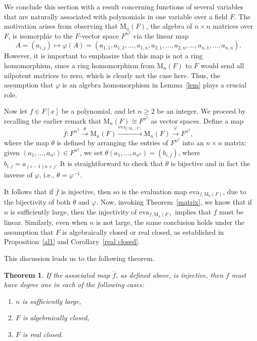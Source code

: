 \documentclass{amsart}
\newtheorem{theorem}{Theorem}[section]
\theoremstyle{definition}
\begin{document}
	We conclude this section with a result concerning functions of several variables that are naturally associated with polynomials in one variable over a field \( F \). The motivation arises from observing that \( \mathrm{M}_n(F) \), the algebra of \( n \times n \) matrices over \( F \), is isomorphic to the \( F \)-vector space \( F^{n^2} \) via the linear map
	\[
	A = (a_{i,j}) \mapsto \varphi(A) = (a_{1,1}, a_{1,2}, \ldots, a_{1,n}, a_{2,1}, \ldots, a_{2,n}, \ldots, a_{n,1}, \ldots, a_{n,n}).
	\]
	However, it is important to emphasize that this map is not a ring homomorphism, since a ring homomorphism from \( \mathrm{M}_n(F) \) to $F$ would send all nilpotent matrices to zero, which is clearly not the case here. Thus, the assumption that \( \varphi \) is an algebra homomorphism in Lemma~\ref{lem} plays a crucial role.
	
	
	Now let \( f \in F[x] \) be a polynomial, and let \( n\geq2 \) be an integer.  We proceed by recalling the earlier remark that \( \mathrm{M}_n(F) \cong F^{n^2} \) as vector spaces. Define a map
	\[
	\overline{f} : F^{n^2} \xrightarrow{\theta} \mathrm{M}_n(F) \xrightarrow{\mathrm{eva}_{f, \mathrm{M}_n(F)}} \mathrm{M}_n(F) \xrightarrow{\varphi} F^{n^2},
	\]
	where the map \( \theta \) is defined by arranging the entries of \( F^{n^2} \) into an \( n \times n \) matrix: given \( (a_1, \ldots, a_{n^2}) \in F^{n^2} \), we set \( \theta(a_1, \ldots, a_{n^2}) = (b_{i,j}) \), where \( b_{i,j} = a_{(i-1)n + j} \). It is straightforward to check that \( \theta \) is bijective and in fact the inverse of \( \varphi \), i.e., \( \theta = \varphi^{-1} \).
	
	It follows that if \( \overline{f} \) is injective, then so is the evaluation map \( \mathrm{eva}_{f, \mathrm{M}_n(F)} \), due to the bijectivity of both \( \theta \) and \( \varphi \). Now, invoking Theorem~\ref{matrix}, we know that if \( n \) is sufficiently large, then the injectivity of \( \mathrm{eva}_{f, \mathrm{M}_n(F)} \) implies that \( f \) must be linear. Similarly, even when \( n \) is not large, the same conclusion holds under the assumption that \( F \) is algebraically closed or real closed, as established in Proposition~\ref{al1} and Corollary~\ref{real closed}.
	
	This discussion leads us to the following theorem.
	
	\begin{theorem}\label{Ax}
		If the associated map \( \overline{f} \), as defined above, is injective, then \( f \) must have degree one in each of the following cases:
		\begin{enumerate}[\rm (i)]
			\item \( n \) is sufficiently large,
			\item \( F \) is algebraically closed,
			\item \( F \) is real closed.
		\end{enumerate}
	\end{theorem}
	
\end{document}
